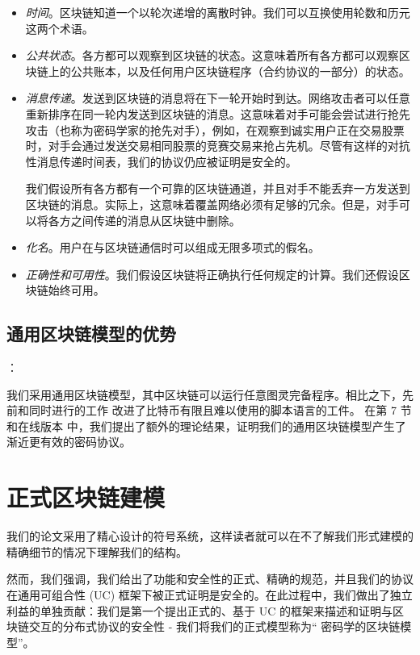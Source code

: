 \documentclass{xduugtrans}
\begin{document}
\begin{itemize}
    \item \textit{时间}。区块链知道一个以轮次递增的离散时钟。我们可以互换使用轮数和历元这两个术语。
    \item \textit{公共状态}。各方都可以观察到区块链的状态。这意味着所有各方都可以观察区块链上的公共账本，以及任何用户区块链程序（合约协议的一部分）的状态。
    \item \textit{消息传递}。发送到区块链的消息将在下一轮开始时到达。网络攻击者可以任意重新排序在同一轮内发送到区块链的消息。这意味着对手可能会尝试进行抢先攻击（也称为密码学家的抢先对手），例如，在观察到诚实用户正在交易股票时，对手会通过发送交易相同股票的竞赛交易来抢占先机。尽管有这样的对抗性消息传递时间表，我们的协议仍应被证明是安全的。 

    我们假设所有各方都有一个可靠的区块链通道，并且对手不能丢弃一方发送到区块链的消息。实际上，这意味着覆盖网络必须有足够的冗余。但是，对手可以将各方之间传递的消息从区块链中删除。
    \item \textit{化名}。用户在与区块链通信时可以组成无限多项式的假名。
    \item \textit{正确性和可用性}。我们假设区块链将正确执行任何规定的计算。我们还假设区块链始终可用。
\end{itemize}

\subsection{通用区块链模型的优势}：

我们采用通用区块链模型，其中区块链可以运行任意图灵完备程序。相比之下，先前和同时进行的工作 \cite{ref7}\cite{ref17}\cite{ref40}\cite{ref50} 改进了比特币有限且难以使用的脚本语言的工件。 在第 7 节和在线版本 \cite{ref37} 中，我们提出了额外的理论结果，证明我们的通用区块链模型产生了渐近更有效的密码协议。

\section{正式区块链建模}

我们的论文采用了精心设计的符号系统，这样读者就可以在不了解我们形式建模的精确细节的情况下理解我们的结构。

然而，我们强调，我们给出了功能和安全性的正式、精确的规范，并且我们的协议在通用可组合性 (UC) 框架下被正式证明是安全的。在此过程中，我们做出了独立利益的单独贡献：我们是第一个提出正式的、基于 UC 的框架来描述和证明与区块链交互的分布式协议的安全性 - 我们将我们的正式模型称为“ 密码学的区块链模型”。
\end{document}
